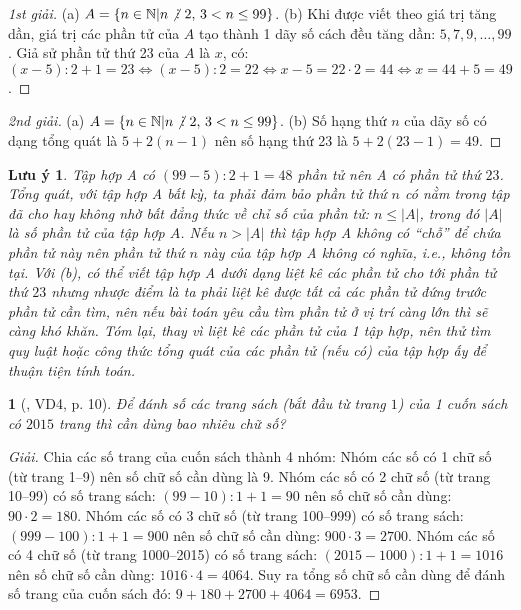 \documentclass{article}
\newtheorem{baitoan}{}
\newtheorem{luuy}{Lưu ý}
\DeclareRobustCommand{\divby}{%
	\mathrel{\vbox{\baselineskip.65ex\lineskiplimit0pt\hbox{.}\hbox{.}\hbox{.}}}%
}
\begin{document}
\begin{proof}[1st giải]
	(a) $A = \{n\in\mathbb{N}|n\not{\divby}\ 2,\,3 < n\le99\}$. (b) Khi được viết theo giá trị tăng dần, giá trị các phần tử của $A$ tạo thành 1 dãy số cách đều tăng dần: $5,7,9,\ldots,99$. Giả sử phần tử thứ 23 của $A$ là $x$, có: $(x - 5):2 + 1 = 23\Leftrightarrow(x - 5):2 = 22\Leftrightarrow x - 5 = 22\cdot2 = 44\Leftrightarrow x = 44 + 5 = 49$.
\end{proof}

\begin{proof}[2nd giải]
	(a) $A = \{n\in\mathbb{N}|n\not{\divby}\ 2,\,3 < n\le99\}$. (b) Số hạng thứ $n$ của dãy số có dạng tổng quát là $5 + 2(n - 1)$ nên số hạng thứ 23 là $5 + 2(23 - 1) = 49$.
\end{proof}

\begin{luuy}
	Tập hợp A có $(99 - 5):2 + 1 = 48$ phần tử nên A có phần tử thứ $23$. Tổng quát, với tập hợp A bất kỳ, ta phải đảm bảo phần tử thứ $n$ có nằm trong tập đã cho hay không nhờ bất đẳng thức về chỉ số của phần tử: $n\le|A|$, trong đó $|A|$ là số phần tử của tập hợp $A$. Nếu $n > |A|$ thì tập hợp A không có ``chỗ'' để chứa phần tử này nên phần tử thứ $n$ này của tập hợp A không có nghĩa, i.e., không tồn tại. Với (b), có thể viết tập hợp A dưới dạng liệt kê các phần tử cho tới phần tử thứ $23$ nhưng nhược điểm là ta phải liệt kê được tất cả các phần tử đứng trước phần tử cần tìm, nên nếu bài toán yêu cầu tìm phần tử ở vị trí càng lớn thì sẽ càng khó khăn. Tóm lại, thay vì liệt kê các phần tử của 1 tập hợp, nên thử tìm quy luật hoặc công thức tổng quát của các phần tử (nếu có) của tập hợp ấy để thuận tiện tính toán.
\end{luuy}

\begin{baitoan}[\cite{Binh_boi_duong_Toan_6_tap_1}, VD4, p. 10]
	Để đánh số các trang sách (bắt đầu từ trang $1$) của 1 cuốn sách có $2015$ trang thì cần dùng bao nhiêu chữ số?
\end{baitoan}

\begin{proof}[Giải]
	Chia các số trang của cuốn sách thành 4 nhóm: Nhóm các số có 1 chữ số (từ trang 1--9) nên số chữ số cần dùng là 9. Nhóm các số có 2 chữ số (từ trang 10--99) có số trang sách: $(99 - 10):1 + 1 = 90$ nên số chữ số cần dùng: $90\cdot2 = 180$. Nhóm các số có 3 chữ số (từ trang 100--999) có số trang sách: $(999 - 100):1 + 1 = 900$ nên số chữ số cần dùng: $900\cdot3 = 2700$. Nhóm các số có 4 chữ số (từ trang 1000--2015) có số trang sách: $(2015 - 1000):1 + 1 = 1016$ nên số chữ số cần dùng: $1016\cdot4 = 4064$. Suy ra tổng số chữ số cần dùng để đánh số trang của cuốn sách đó: $9 + 180 + 2700 + 4064 = 6953$.
\end{proof}
\end{document}
